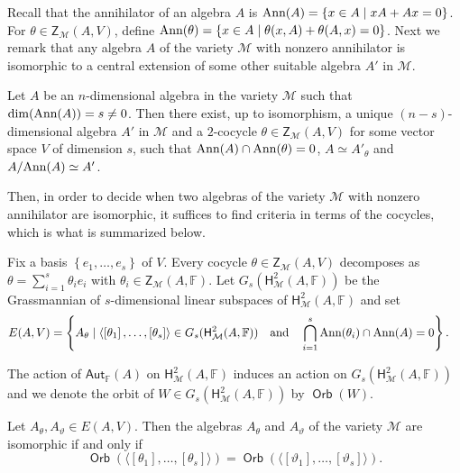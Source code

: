\documentclass{commat}
\newcommand\q{\quad}
\newcommand{\ann}{\hbox{\rm Ann}}
\newcommand{\FF}{\mathbb{F}}
\newcommand\aut[1][\FF]{ \mathsf{Aut}_{#1}}
\newcommand{\pb}[1]{\left\{ #1\right\}}
\begin{document}
Recall that the annihilator of an algebra $A$ is $\ann (A)=\pb{x\in{A}\mid xA + Ax=0}$.
For $\theta\in\mathsf{Z}_{\mathcal M}(A, V)$, define $\ann(\theta)=\pb{x\in A\mid \theta(x, A)+\theta ( A, x)=0}$. Next we remark that any algebra $A$ of the variety ${\mathcal M}$ with nonzero annihilator is isomorphic to a central extension of some other suitable algebra ${A'}$ in ${\mathcal M}$. 

\begin{lemma}\label{lm:first}
	Let ${A}$ be an $n$-dimensional algebra in the variety ${\mathcal M}$ such that $\dim(\ann({ A}))=s\neq0$. Then there exist, up to isomorphism, a unique $(n-s)$-dimensional algebra ${A}'$ in $\mathcal M$ and a $2$-cocycle $\theta \in \mathsf{Z}_{\mathcal M}(A, V)$ for some vector space ${V}$ of dimension $s$, such that $\ann({A})\cap\ann(\theta)=0$,  ${A} \simeq {A'}_{\theta}$ and
	${A}/\ann({A})\simeq {A}'$.
\end{lemma}

Then, in order to decide when two algebras of the variety $\mathcal M$ with nonzero annihilator are isomorphic, it suffices to find criteria in terms of the cocycles, which is what is summarized below.

Fix a basis $\pb{e_{1},\ldots ,e_{s}}$ of ${V}$. Every cocycle $\theta\in \mathsf{Z}_{\mathcal M}(A, V)$ decomposes as $\theta=\sum_{i=1}^{s}\theta_i e_i$ with $\theta_i\in \mathsf{Z}_{\mathcal M}(A, \FF)$. Let $G_s(\mathsf{H}^2_{\mathcal M}({A},{\FF}))$ be the Grassmannian of $s$-dimensional linear subspaces of $\mathsf{H}^2_{\mathcal M}({A},{\FF})$ and set 
\begin{align*}
	E( {A},{V}) &=\pb{ {A}_{\theta }\mid \langle \left[ \theta _{1}\right],\dots,\left[ \theta _{s}\right] \rangle \in G_s(\mathsf{H}^2_{\mathcal M}({A},{\FF}))
		\q\text{and}\q 
		\bigcap\limits_{i=1}^{s}\ann(\theta _{i})\cap\ann({A}) =0}.
\end{align*}

The action of $\aut(A)$ on $\mathsf{H}^2_{\mathcal M}({A},{\FF})$ induces an action on $G_s(\mathsf{H}^2_{\mathcal M}({A},{\FF}))$ and we denote the orbit of $W\in G_s(\mathsf{H}^2_{\mathcal M}({A},{\FF}))$ by $\operatorname{\mathsf{Orb}}{(W)}$.




\begin{lemma}
	Let ${A}_{\theta },{A}_{\vartheta }\in E( {A},{V}) $. 
	Then the algebras ${A}_{\theta }$ and ${A}_{\vartheta } $ of the variety ${\mathcal M}$ are isomorphic
	if and only if
	\[\operatorname{\mathsf{Orb}}(\langle \left[ \theta _{1}\right] ,
	\dots,\left[ \theta _{s}\right] \rangle) =
	\operatorname{\mathsf{Orb}} (\langle \left[ \vartheta _{1}\right] ,\dots,\left[ \vartheta _{s}\right]\rangle).\]
\end{lemma}
\end{document}
